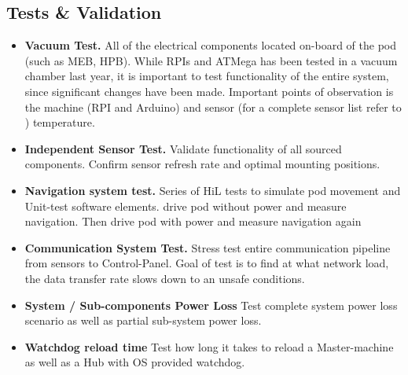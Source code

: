     \subsection{Tests \& Validation}
    \begin{itemize}
    \item \textbf{Vacuum Test.} All of the electrical components located on-board of the pod (such as MEB, HPB). While RPIs and ATMega has been tested in a vacuum chamber last year, it is important to test functionality of the entire system, since significant changes have been made. Important points of observation is the machine (RPI and Arduino) and sensor (for a complete sensor list refer to ) temperature. 
    \item \textbf{Independent Sensor Test.} Validate functionality of all sourced components. Confirm sensor refresh rate and optimal mounting positions.
    \item \textbf{Navigation system test.} Series of HiL tests to simulate pod movement and Unit-test software elements. drive pod without power and measure navigation. Then drive pod with power and measure navigation again
    \item \textbf{Communication System Test.} Stress test entire communication pipeline from sensors to Control-Panel. Goal of test is to find at what network load, the data transfer rate slows down to an unsafe conditions.
    \item \textbf{System / Sub-components Power Loss} Test complete system power loss scenario as well as partial sub-system power loss.
    \item \textbf{Watchdog reload time} Test how long it takes to reload a Master-machine as well as a Hub with OS provided watchdog.
    \end{itemize}


